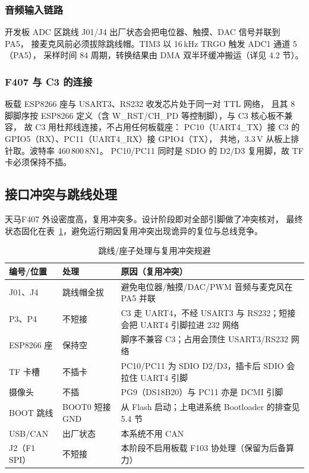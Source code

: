 \subsubsection{音频输入链路}
开发板 ADC 区跳线 J01/J4 出厂状态会把电位器、触摸、DAC 信号并联到 PA5，
接麦克风前必须拔除跳线帽。TIM3 以 16\,kHz TRGO 触发 ADC1 通道 5（PA5），
采样时间 84 周期，转换结果由 DMA 双半环缓冲搬运（详见 4.2 节）。

\subsubsection{F407 与 C3 的连接}
板载 ESP8266 座与 USART3、RS232 收发芯片处于同一对 TTL 网络，
且其 8 脚脚序按 ESP8266 定义（含 W\_RST/CH\_PD 等控制脚），与 C3 核心板不兼容，
故 C3 用杜邦线连接，不占用任何板载座：
PC10（UART4\_TX）接 C3 的 GPIO5（RX）、PC11（UART4\_RX）接 GPIO4（TX），
共地，3.3\,V 从板上排针取。波特率 460\,800\,8N1。
PC10/PC11 同时是 SDIO 的 D2/D3 复用脚，故 TF 卡必须保持不插。

\subsection{接口冲突与跳线处理}
天马F407 外设密度高，复用冲突多。设计阶段即对全部引脚做了冲突核对，
最终状态固化在表~\ref{tab:jumper}，避免运行期因复用冲突出现诡异的复位与总线竞争。

\begin{table}[htbp]
\centering\small
\caption{跳线/座子处理与复用冲突规避}\label{tab:jumper}
\begin{tabular}{@{}p{1.8cm}p{4.6cm}p{7.0cm}@{}}
\toprule
编号/位置 & 处理 & 原因（复用冲突）\\
\midrule
J01、J4 & 跳线帽全拔 & 避免电位器/触摸/DAC/PWM 音频与麦克风在 PA5 并联\\
P3、P4 & 不短接 & C3 走 UART4，不经 USART3 与 RS232；短接会把 UART4 引脚拉进 232 网络\\
ESP8266 座 & 保持空 & 脚序不兼容 C3；占用会顶住 USART3/RS232 网络\\
TF 卡槽 & 不插卡 & PC10/PC11 为 SDIO D2/D3，插卡后 SDIO 会拉住 UART4 引脚\\
摄像头 & 不插 & PG9（DS18B20）与 PC11 亦是 DCMI 引脚\\
BOOT 跳线 & BOOT0 短接 GND & 从 Flash 启动；上电进系统 Bootloader 的排查见 5.4 节\\
USB/CAN & 出厂状态 & 本系统不用 CAN\\
J2（F1 SPI） & 不短接 & 本阶段不启用板载 F103 协处理（保留为后备算力）\\
\bottomrule
\end{tabular}
\end{table}
